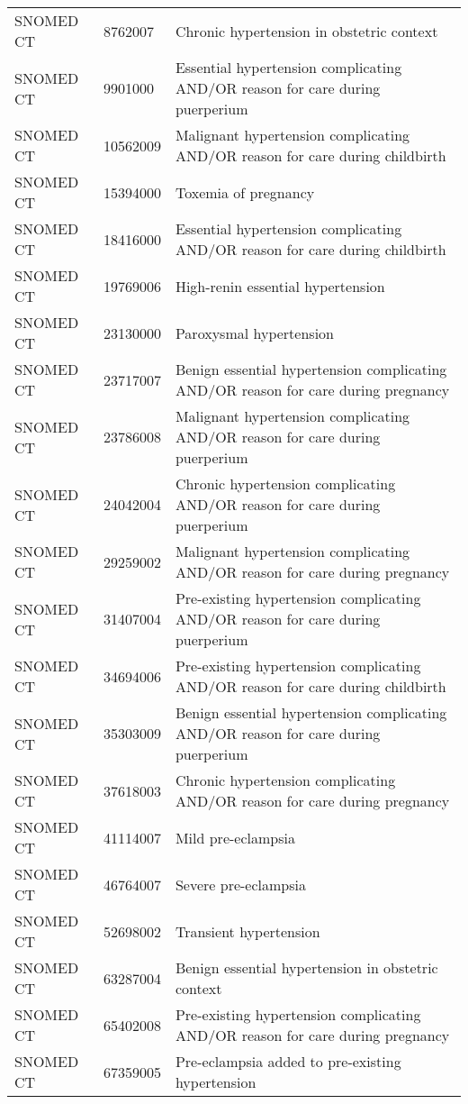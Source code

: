 \begin{longtable}{p{}p{}p{}}
  SNOMED CT & 8762007 & Chronic hypertension in obstetric context \\ 
  SNOMED CT & 9901000 & Essential hypertension complicating AND/OR reason for care during puerperium \\ 
  SNOMED CT & 10562009 & Malignant hypertension complicating AND/OR reason for care during childbirth \\ 
  SNOMED CT & 15394000 & Toxemia of pregnancy \\ 
  SNOMED CT & 18416000 & Essential hypertension complicating AND/OR reason for care during childbirth \\ 
  SNOMED CT & 19769006 & High-renin essential hypertension \\ 
  SNOMED CT & 23130000 & Paroxysmal hypertension \\ 
  SNOMED CT & 23717007 & Benign essential hypertension complicating AND/OR reason for care during pregnancy \\ 
  SNOMED CT & 23786008 & Malignant hypertension complicating AND/OR reason for care during puerperium \\ 
  SNOMED CT & 24042004 & Chronic hypertension complicating AND/OR reason for care during puerperium \\ 
  SNOMED CT & 29259002 & Malignant hypertension complicating AND/OR reason for care during pregnancy \\ 
  SNOMED CT & 31407004 & Pre-existing hypertension complicating AND/OR reason for care during puerperium \\ 
  SNOMED CT & 34694006 & Pre-existing hypertension complicating AND/OR reason for care during childbirth \\ 
  SNOMED CT & 35303009 & Benign essential hypertension complicating AND/OR reason for care during puerperium \\ 
  SNOMED CT & 37618003 & Chronic hypertension complicating AND/OR reason for care during pregnancy \\ 
  SNOMED CT & 41114007 & Mild pre-eclampsia \\ 
  SNOMED CT & 46764007 & Severe pre-eclampsia \\ 
  SNOMED CT & 52698002 & Transient hypertension \\ 
  SNOMED CT & 63287004 & Benign essential hypertension in obstetric context \\ 
  SNOMED CT & 65402008 & Pre-existing hypertension complicating AND/OR reason for care during pregnancy \\ 
  SNOMED CT & 67359005 & Pre-eclampsia added to pre-existing hypertension \\ 

\end{longtable}
